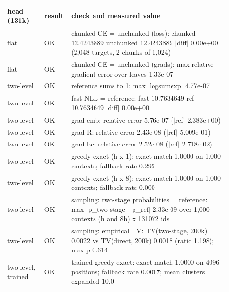 \begin{tabular}{p{0.16\linewidth}p{0.06\linewidth}p{0.68\linewidth}}
\toprule
head (131k) & result & check and measured value \\
\midrule
flat & OK & chunked CE = unchunked (loss): chunked 12.4243889 unchunked 12.4243889 $|$diff$|$ 0.00e+00 (2,048 targets, 2 chunks of 1,024) \\
flat & OK & chunked CE = unchunked (grads): max relative gradient error over leaves 1.33e-07 \\
two-level & OK & reference sums to 1: max $|$logsumexp$|$ 4.77e-07 \\
two-level & OK & fast NLL = reference: fast 10.7634649 ref 10.7634649 $|$diff$|$ 0.00e+00 \\
two-level & OK & grad emb: relative error 5.76e-07 ($|$ref$|$ 2.383e+00) \\
two-level & OK & grad R: relative error 2.43e-08 ($|$ref$|$ 5.009e-01) \\
two-level & OK & grad bc: relative error 2.52e-08 ($|$ref$|$ 2.718e-02) \\
two-level & OK & greedy exact (h x 1): exact-match 1.0000 on 1,000 contexts; fallback rate 0.295 \\
two-level & OK & greedy exact (h x 8): exact-match 1.0000 on 1,000 contexts; fallback rate 0.000 \\
two-level & OK & sampling: two-stage probabilities = reference: max $|$p\_two-stage - p\_ref$|$ 2.33e-09 over 1,000 contexts (h and 8h) x 131072 ids \\
two-level & OK & sampling: empirical TV: TV(two-stage, 200k) 0.0022 vs TV(direct, 200k) 0.0018 (ratio 1.198); max p 0.614 \\
two-level, trained & OK & trained greedy exact: exact-match 1.0000 on 4096 positions; fallback rate 0.0017; mean clusters expanded 10.0 \\
\bottomrule
\end{tabular}
